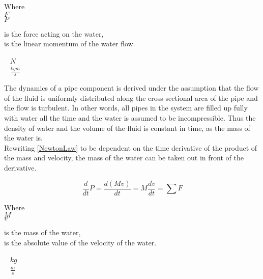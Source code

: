\begin{minipage}[t]{0.20\textwidth}
Where\\
\hspace*{8mm} $F$ \\
\hspace*{8mm} $P$ 
\end{minipage}
\begin{minipage}[t]{0.68\textwidth}
\vspace*{2mm}
is the force acting on the water,\\
is the linear momentum of the water flow.

\end{minipage}
\begin{minipage}[t]{0.10\textwidth}
\vspace*{2mm}
\textcolor{White}{te}$\unit{N}$\\
\textcolor{White}{te}$\unit{\frac{kgm}{s}}$
\end{minipage}

The dynamics of a pipe component is derived under the assumption that the flow of the fluid is uniformly distributed along the cross sectional area of the pipe and the flow is turbulent. In other words, all pipes in the system are filled up fully with water all the time and the water is assumed to be incompressible. Thus the density of water and the volume of the fluid is constant in time, as the mass of the water is.
\\
Rewriting \ref{NewtonLaw} to be dependent on the time derivative of the product of the mass and velocity, the mass of the water can be taken out in front of the derivative.

\begin{equation}
  \frac{d}{dt} P = {\frac{d(M v)}{dt}} = M \frac{dv}{dt} = \sum F
\end{equation} 

\begin{minipage}[t]{0.20\textwidth}
Where\\
\hspace*{8mm} $M$ \\
\hspace*{8mm} $v$ 
\end{minipage}
\begin{minipage}[t]{0.68\textwidth}
\vspace*{2mm}
is the mass of the water,\\
is the absolute value of the velocity of the water.

\end{minipage}
\begin{minipage}[t]{0.10\textwidth}
\vspace*{2mm}
\textcolor{White}{te}$\unit{kg}$\\
\textcolor{White}{te}$\unit{\frac{m}{s}}$
\end{minipage}

